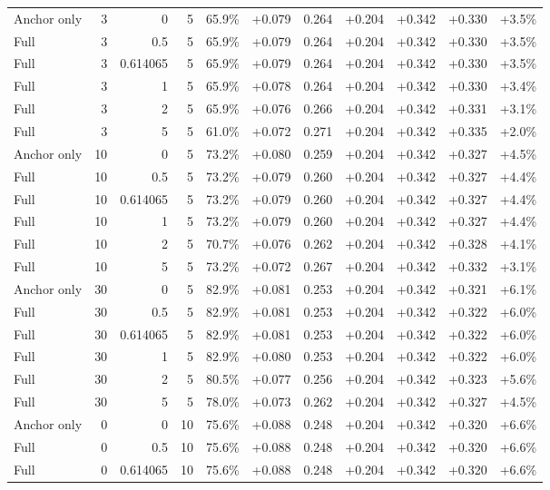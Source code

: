 \begin{table}[htbp]
\begin{tabular}{lrrrccccccc}
Anchor only & 3 & 0 & 5 & 65.9\% & +0.079 & 0.264 & +0.204 & +0.342 & +0.330 & +3.5\% \\
Full & 3 & 0.5 & 5 & 65.9\% & +0.079 & 0.264 & +0.204 & +0.342 & +0.330 & +3.5\% \\
Full & 3 & 0.614065 & 5 & 65.9\% & +0.079 & 0.264 & +0.204 & +0.342 & +0.330 & +3.5\% \\
Full & 3 & 1 & 5 & 65.9\% & +0.078 & 0.264 & +0.204 & +0.342 & +0.330 & +3.4\% \\
Full & 3 & 2 & 5 & 65.9\% & +0.076 & 0.266 & +0.204 & +0.342 & +0.331 & +3.1\% \\
Full & 3 & 5 & 5 & 61.0\% & +0.072 & 0.271 & +0.204 & +0.342 & +0.335 & +2.0\% \\
Anchor only & 10 & 0 & 5 & 73.2\% & +0.080 & 0.259 & +0.204 & +0.342 & +0.327 & +4.5\% \\
Full & 10 & 0.5 & 5 & 73.2\% & +0.079 & 0.260 & +0.204 & +0.342 & +0.327 & +4.4\% \\
Full & 10 & 0.614065 & 5 & 73.2\% & +0.079 & 0.260 & +0.204 & +0.342 & +0.327 & +4.4\% \\
Full & 10 & 1 & 5 & 73.2\% & +0.079 & 0.260 & +0.204 & +0.342 & +0.327 & +4.4\% \\
Full & 10 & 2 & 5 & 70.7\% & +0.076 & 0.262 & +0.204 & +0.342 & +0.328 & +4.1\% \\
Full & 10 & 5 & 5 & 73.2\% & +0.072 & 0.267 & +0.204 & +0.342 & +0.332 & +3.1\% \\
Anchor only & 30 & 0 & 5 & 82.9\% & +0.081 & 0.253 & +0.204 & +0.342 & +0.321 & +6.1\% \\
Full & 30 & 0.5 & 5 & 82.9\% & +0.081 & 0.253 & +0.204 & +0.342 & +0.322 & +6.0\% \\
Full & 30 & 0.614065 & 5 & 82.9\% & +0.081 & 0.253 & +0.204 & +0.342 & +0.322 & +6.0\% \\
Full & 30 & 1 & 5 & 82.9\% & +0.080 & 0.253 & +0.204 & +0.342 & +0.322 & +6.0\% \\
Full & 30 & 2 & 5 & 80.5\% & +0.077 & 0.256 & +0.204 & +0.342 & +0.323 & +5.6\% \\
Full & 30 & 5 & 5 & 78.0\% & +0.073 & 0.262 & +0.204 & +0.342 & +0.327 & +4.5\% \\
Anchor only & 0 & 0 & 10 & 75.6\% & +0.088 & 0.248 & +0.204 & +0.342 & +0.320 & +6.6\% \\
Full & 0 & 0.5 & 10 & 75.6\% & +0.088 & 0.248 & +0.204 & +0.342 & +0.320 & +6.6\% \\
Full & 0 & 0.614065 & 10 & 75.6\% & +0.088 & 0.248 & +0.204 & +0.342 & +0.320 & +6.6\% \\

\end{tabular}
\end{table}
